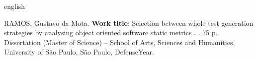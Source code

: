 \documentclass[
	12pt,				%
	oneside,			%
	a4paper,			%
	english,			%
	brazil				%
	]{abntex2ppgsi}
\begin{document}
% 
% 
\begin{resumo}[Abstract]
\begin{otherlanguage*}{english}

% 
%
%
%
\begin{flushleft}
RAMOS, Gustavo da Mota. \textbf{Work title}: Selection between whole test generation strategies by analysing object oriented software  static metrics .  \imprimirdata. 75 p. Dissertation (Master of Science) – School of Arts, Sciences and Humanities, University of São Paulo, São Paulo, DefenseYear. 
\end{flushleft}


\end{otherlanguage*}
\end{resumo}
\end{document}

